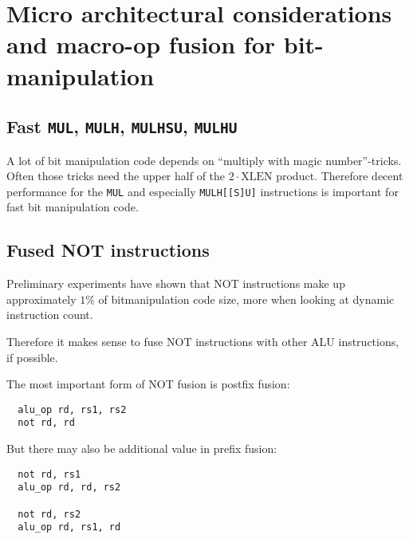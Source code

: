 
\section{Micro architectural considerations and macro-op fusion for bit-manipulation}


\subsection{Fast {\tt MUL}, {\tt MULH}, {\tt MULHSU}, {\tt MULHU}}

A lot of bit manipulation code depends on ``multiply with magic number''-tricks. Often those
tricks need the upper half of the $2 \cdot \textrm{XLEN}$ product. Therefore decent performance
for the \texttt{MUL} and especially \texttt{MULH[[S]U]} instructions is important for fast
bit manipulation code.


\subsection{Fused NOT instructions}

Preliminary experiments have shown that NOT instructions make up approximately
$1\%$ of bitmanipulation code size, more when looking at dynamic instruction count.~\cite{Wolf17A}

Therefore it makes sense to fuse NOT instructions with other ALU instructions, if possible.

The most important form of NOT fusion is postfix fusion:

\begin{minipage}{\linewidth}
\begin{verbatim}
  alu_op rd, rs1, rs2
  not rd, rd
\end{verbatim}
\end{minipage}

But there may also be additional value in prefix fusion:

\begin{minipage}{\linewidth}
\begin{verbatim}
  not rd, rs1
  alu_op rd, rd, rs2

  not rd, rs2
  alu_op rd, rs1, rd
\end{verbatim}
\end{minipage}

